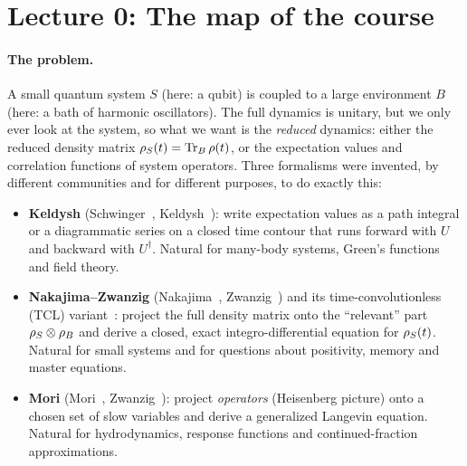 \section*{Lecture 0: The map of the course}
\label{sec:overview}

\paragraph{The problem.}
A small quantum system $S$ (here: a qubit) is coupled to a large environment $B$ (here: a bath of harmonic oscillators).
The full dynamics is unitary, but we only ever look at the system, so what we want is the \emph{reduced} dynamics: either the reduced density matrix $\rho_{S}(t)=\operatorname{Tr}_B\rho(t)$, or the expectation values and correlation functions of system operators.
Three formalisms were invented, by different communities and for different purposes, to do exactly this:
\begin{itemize}[itemsep=1pt]
\item \textbf{Keldysh} (Schwinger~\cite{Schwinger1961}, Keldysh~\cite{Keldysh1964}): write expectation values as a path integral or a diagrammatic series on a closed time contour that runs forward with $U$ and backward with $U^\dagger$.
  Natural for many-body systems, Green's functions and field theory.
\item \textbf{Nakajima--Zwanzig} (Nakajima~\cite{Nakajima1958}, Zwanzig~\cite{Zwanzig1960}) and its time-convolutionless (TCL) variant~\cite{Shibata1977,Chaturvedi1979}: project the full density matrix onto the ``relevant'' part $\rho_{S}\otimes\rho_{B}$ and derive a closed, exact integro-differential equation for $\rho_{S}(t)$.
  Natural for small systems and for questions about positivity, memory and master equations.
\item \textbf{Mori} (Mori~\cite{Mori1965}, Zwanzig~\cite[Ch.~8]{ZwanzigBook}): project \emph{operators} (Heisenberg picture) onto a chosen set of slow variables and derive a generalized Langevin equation.
  Natural for hydrodynamics, response functions and continued-fraction approximations.
\end{itemize}

